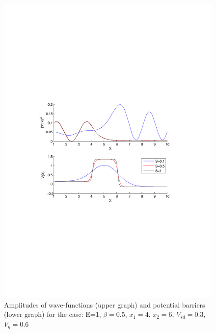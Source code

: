 \documentclass[a4paper]{article}
\begin{document}
\begin{figure}[h!]
\centering
\includegraphics[scale=0.85, trim = 35mm 100mm 35mm 100mm, clip]{test}
\caption{Amplitudes of wave-functions (upper graph) and potential barriers (lower graph) for the case: E=1, $\beta=0.5$, $x_1=4$, $x_2=6$, $V_{sd}=0.3$, $V_g=0.6$}
\label{fig:test}
\end{figure}
\end{document}
